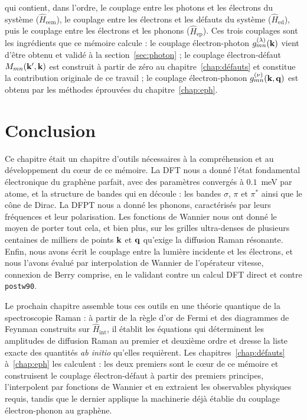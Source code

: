 qui contient, dans l'ordre, le couplage entre les photons et les électrons du système ($\hat{H}_\text{eem}$), le couplage entre les électrons et les défauts du système ($\hat{H}_\text{ed}$), puis le couplage entre les électrons et les phonons ($\hat{H}_\text{ep}$). Ces trois couplages sont les ingrédients que ce mémoire calcule : le couplage électron-photon $g^{(\lambda)}_{mn}(\mathbf{k})$ vient d'être obtenu et validé à la section~\ref{sec:photon} ; le couplage électron-défaut $M_{mn}(\mathbf{k}',\mathbf{k})$ est construit à partir de zéro au chapitre~\ref{chap:défauts} et constitue la contribution originale de ce travail ; le couplage électron-phonon $g_{mn}^{(\nu)}(\mathbf{k},\mathbf{q})$ est obtenu par les méthodes éprouvées du chapitre~\ref{chap:eph}.

\section{Conclusion}

Ce chapitre était un chapitre d'outils nécessaires à la compréhension et au développement du c\oe ur de ce mémoire. La DFT nous a donné l'état fondamental électronique du graphène parfait, avec des paramètres convergés à $0.1$~meV par atome, et la structure de bandes qui en découle : les bandes $\sigma$, $\pi$ et $\pi^*$ ainsi que le cône de Dirac. La DFPT nous a donné les phonons, caractérisés par leurs fréquences et leur polarisation. Les fonctions de Wannier nous ont donné le moyen de porter tout cela, et bien plus, sur les grilles ultra-denses de plusieurs centaines de milliers de points $\mathbf{k}$ et $\mathbf{q}$ qu'exige la diffusion Raman résonante. Enfin, nous avons écrit le couplage entre la lumière incidente et les électrons, et nous l'avons évalué par interpolation de Wannier de l'opérateur vitesse, connexion de Berry comprise, en le validant contre un calcul DFT direct et contre \texttt{postw90}.

Le prochain chapitre assemble tous ces outils en une théorie quantique de la spectroscopie Raman : à partir de la règle d'or de Fermi et des diagrammes de Feynman construits sur $\hat{H}_\text{int}$, il établit les équations qui déterminent les amplitudes de diffusion Raman au premier et deuxième ordre et dresse la liste exacte des quantités \textit{ab initio} qu'elles requièrent. Les chapitres~\ref{chap:défauts} à~\ref{chap:eph} les calculent : les deux premiers sont le c\oe ur de ce mémoire et construisent le couplage électron-défaut à partir des premiers principes, l'interpolent par fonctions de Wannier et en extraient les observables physiques requis, tandis que le dernier applique la machinerie déjà établie du couplage électron-phonon au graphène.